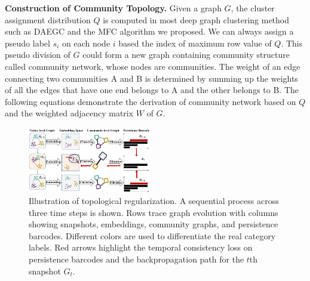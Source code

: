 \documentclass[letterpaper]{article} %
\begin{document}
\noindent\textbf{Construction of Community Topology.}
Given a graph $G$, the cluster assignment distribution $Q$ is computed in most deep graph clustering method such as DAEGC and the MFC algorithm we proposed. We can always assign a pseudo label $s_i$ on each node $i$ based the index of maximum row value of $Q$. This pseudo division of $G$ could form a new graph containing community structure called community network, whose nodes are communities. The weight of an edge connecting two communities A and B is determined by summing up the weights of all the edges that have one end belongs to A and the other belongs to B. The following equations demonstrate the derivation of community network based on $Q$ and the weighted adjacency matrix $W$ of $G$. 
\begin{figure}[] %
\centering %
\includegraphics[width=0.48\textwidth]{pic/topoloss_v2_0815.pdf} %
\caption{Illustration of topological regularization. %
A sequential process across three time steps is shown. Rows trace graph evolution with columns showing snapshots, embeddings, community graphs, and persistence barcodes. Different colors are used to differentiate the real category labels. Red arrows highlight the temporal consistency loss on persistence barcodes and the backpropagation path for the $t$th snapshot $G_t$. 
} 
\label{Fig.topoloss} %
\end{figure}
\end{document}

